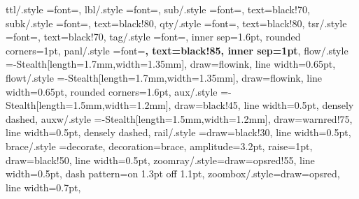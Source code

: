 {  %
  ttl/.style   ={font=\footnotesize\bfseries},
  lbl/.style   ={font=\footnotesize},
  sub/.style   ={font=\scriptsize, text=black!70},
  subk/.style  ={font=\footnotesize, text=black!80},
  qty/.style   ={font=\footnotesize, text=black!80},%
  tsr/.style ={font=\scriptsize\ttfamily, text=black!70},%
  tag/.style   ={font=\scriptsize, inner sep=1.6pt, rounded corners=1pt},
  panl/.style  ={font=\footnotesize\bfseries, text=black!85, inner sep=1pt},
  flow/.style  ={-{Stealth[length=1.7mm,width=1.35mm]}, draw=flowink,
                 line width=0.65pt},
  flowt/.style ={-{Stealth[length=1.7mm,width=1.35mm]}, draw=flowink,
                 line width=0.65pt, rounded corners=1.6pt},
  aux/.style   ={-{Stealth[length=1.5mm,width=1.2mm]}, draw=black!45,
                 line width=0.5pt, densely dashed},
  auxw/.style  ={-{Stealth[length=1.5mm,width=1.2mm]}, draw=warnred!75,
                 line width=0.5pt, densely dashed},
  rail/.style  ={draw=black!30, line width=0.5pt},
  brace/.style ={decorate, decoration={brace, amplitude=3.2pt, raise=1pt},
                 draw=black!50, line width=0.5pt},
  zoomray/.style={draw=opsred!55, line width=0.5pt,
                  dash pattern=on 1.3pt off 1.1pt},
  zoombox/.style={draw=opsred, line width=0.7pt},
}

